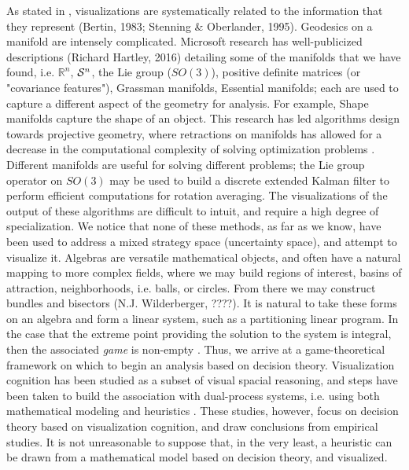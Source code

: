 As stated in \citet{VIS},
visualizations are systematically related to the information that they represent 
(Bertin, 1983; Stenning \& Oberlander, 1995).
Geodesics on a manifold are intensely complicated. Microsoft research has
well-publicized descriptions (Richard Hartley, 2016) detailing some of the
manifolds that we have found, i.e. $\mathbb{R}^n$, $\mathcal{S}^n$, the Lie group
($SO(3)$), positive definite matrices (or "covariance features"), Grassman
manifolds, Essential manifolds; each are used to capture a different aspect of
the geometry for analysis. For example, Shape manifolds capture the shape of an object. This
research has led algorithms design towards projective geometry, where retractions on
manifolds has allowed for a decrease in the computational complexity of solving
optimization problems \citet{MECH}. Different manifolds are useful
for solving different problems; the Lie group operator on $SO(3)$ may be used to
build a discrete extended Kalman filter to perform efficient computations
for rotation averaging. The visualizations of the output of these algorithms
are difficult to intuit, and require a high degree of specialization. We notice 
that none of these methods, as far as we know,
have been used to address a mixed strategy space (uncertainty space), and attempt to
visualize it. Algebras are versatile mathematical objects, and often
have a natural mapping to more complex fields, where we may build
regions of interest, basins of attraction, neighborhoods, i.e. balls, or
circles. From there we may construct bundles and bisectors (N.J.
Wilderberger, ????). It is natural to take these forms on an algebra and form a linear
system, such as a partitioning linear program. In the case that the
extreme point providing the solution to the system is integral, then the
associated \emph{game} is non-empty \citet{FAIR}. 
Thus, we arrive at a game-theoretical framework on which to begin an
analysis based on decision theory. Visualization cognition has been
studied as a subset of visual spacial reasoning, and steps have been
taken to build the association with dual-process systems, i.e. using both
mathematical modeling and heuristics \citet{VIS}. These
studies, however, focus on decision theory based on visualization
cognition, and draw conclusions from empirical studies. It is not
unreasonable to suppose that, in the very least, a
heuristic can be drawn from a mathematical model based on decision theory, and visualized.

